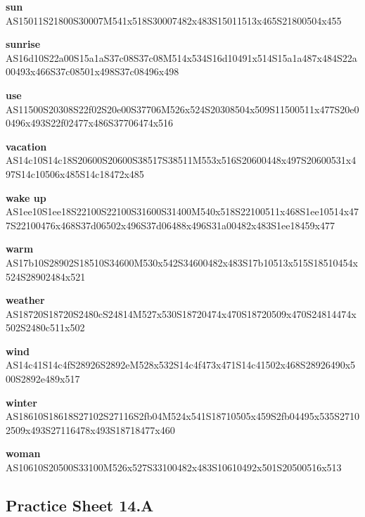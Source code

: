 \documentclass{article}
\begin{document}
\begin{glossary}
\textbf{sun}\\
AS15011S21800S30007M541x518S30007482x483S15011513x465S21800504x455

\textbf{sunrise}\\
AS16d10S22a00S15a1aS37c08S37c08M514x534S16d10491x514S15a1a487x484S22a00493x466S37c08501x498S37c08496x498

\textbf{use}\\
AS11500S20308S22f02S20e00S37706M526x524S20308504x509S11500511x477S20e00496x493S22f02477x486S37706474x516

\textbf{vacation}\\
AS14c10S14c18S20600S20600S38517S38511M553x516S20600448x497S20600531x497S14c10506x485S14c18472x485

\textbf{wake up}\\
AS1ee10S1ee18S22100S22100S31600S31400M540x518S22100511x468S1ee10514x477S22100476x468S37d06502x496S37d06488x496S31a00482x483S1ee18459x477

\textbf{warm}\\
AS17b10S28902S18510S34600M530x542S34600482x483S17b10513x515S18510454x524S28902484x521

\textbf{weather}\\
AS18720S18720S2480cS24814M527x530S18720474x470S18720509x470S24814474x502S2480c511x502

\textbf{wind}\\
AS14c41S14c4fS28926S2892eM528x532S14c4f473x471S14c41502x468S28926490x500S2892e489x517

\textbf{winter}\\
AS18610S18618S27102S27116S2fb04M524x541S18710505x459S2fb04495x535S27102509x493S27116478x493S18718477x460

\textbf{woman}\\
AS10610S20500S33100M526x527S33100482x483S10610492x501S20500516x513

\end{glossary}

\subsection{Practice Sheet 14.A}
\end{document}
